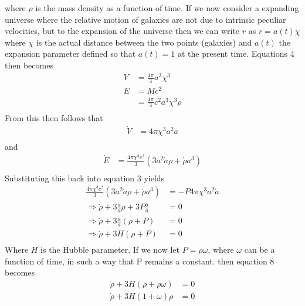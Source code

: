 \documentclass[a4paper, 11pt]{FSKH_623_Report}
\begin{document}
where $\rho$ is the mass density as a function of time.
If we now consider a expanding universe where the relative motion of galaxies are not due to intrinsic peculiar velocities, but to the expansion of the universe then we can write $r$ as $r=a(t)\chi$ where $\chi$ is the actual distance between the two points (galaxies) and $a(t)$ the expansion parameter defined so that $a(t)=1$ at the present time. Equations 4 then becomes
\begin{equation}
\begin{split}
V &= \frac{4\pi}{3}a^{3}\chi^{3}\\
E &= Mc^{2}\\
&=\frac{4\pi}{3}c^{2}a^{3}\chi^{3}\rho\\
\end{split}
\end{equation}
From this then follows that
\begin{equation}
\begin{split}
\dot{V} &= 4\pi\chi^{3}a^{2}\dot{a}\\
\end{split}
\end{equation}
and
\begin{equation}
\begin{split}
\dot{E} &= \frac{4\pi\chi^{3} c^{2}}{3}\left(3a^{2}\dot{a}\rho+\dot{\rho}a^{3}\right)\\
\end{split}
\end{equation}
Substituting this back into equation 3 yields
\begin{equation}
\begin{split}
\frac{4\pi\chi^{3} c^{2}}{3}\left(3a^{2}\dot{a}\rho+\dot{\rho}a^{3}\right) &= -P4\pi\chi^{3}a^{2}\dot{a}\\
\Rightarrow \dot{\rho}+3\frac{\dot{a}}{a}\rho+3P\frac{\dot{a}}{a} &= 0\\
\Rightarrow \dot{\rho}+3\frac{\dot{a}}{a}\left(\rho+P\right) &= 0\\
\Rightarrow \dot{\rho}+3H\left(\rho+P\right) &= 0\\
\end{split}
\end{equation}
Where $H$ is the Hubble parameter.
If we now let $P=\rho\omega$, where $\omega$ can be a function of time, in such a way that P remains a constant.
then equation 8 becomes
\begin{equation}
\begin{split}
\dot{\rho}+3H\left(\rho+\rho\omega\right) &= 0\\
\dot{\rho}+3H\left(1+\omega\right)\rho &= 0\\
\end{split}
\end{equation}
\end{document}
